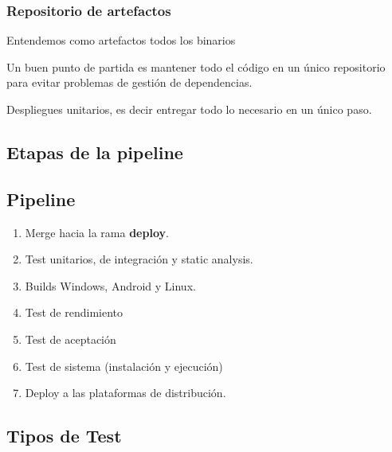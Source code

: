 \subsubsection{Repositorio de artefactos}

Entendemos como artefactos todos los binarios

Un buen punto de partida es mantener todo el código en un único repositorio para evitar problemas de gestión de dependencias.

Despliegues unitarios, es decir entregar todo lo necesario en un único paso.

\subsection{Etapas de la pipeline}




\subsection{Pipeline}

\begin{enumerate}
  \item Merge hacia la rama \textbf{deploy}.
  \item Test unitarios, de integración y static analysis.
  \item Builds Windows, Android y Linux.
  \item Test de rendimiento
  \item Test de aceptación
  \item Test de sistema (instalación y ejecución)
  \item Deploy a las plataformas de distribución.
\end{enumerate}



\subsection{Tipos de Test}\label{pipeline:tipos-de-test}

